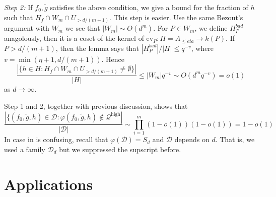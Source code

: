 \documentclass[12pt]{article}
\theoremstyle{plain}
\theoremstyle{definition}
\newcommand{\sD}{\mathcal{D}}
\newcommand{\<}{\langle}
\renewcommand{\>}{\rangle}
\def\wt{\widetilde}
\newcommand{\Qhigh}{\mathcal{Q}^\mathrm{high}}
\newcommand{\ev}{\mathrm{ev}}
\begin{document}
\textit{Step 2:} If $f_0, \wt{g}$ satisfies the above condition, we give a bound for the fraction of $h$ such that $H_f \cap W_m \cap U_{> d/(m+1)}$.  
This step is easier. Use the same Bezout's argument with $W_m$ we see that $|W_m| \sim O(d^m)$. For $P \in W_m$, we define $H_P^{bad}$ anagolously, then it is a coset of the kernel of $\ev_P : H = A_{\le eta} \to k(P)$. If $P > d/(m+1)$, then the lemma says that $|H_P^{bad}|/|H| \le q^{-v}$, where $v = \min (\eta + 1, d/(m+1))$. Hence
$$\frac{|\{h \in H : H_f \cap W_m \cap U_{> d/(m+1)} \neq \emptyset \}|}{|H|} \le |W_m| q^{-v} \sim O(d^m q^{-v}) = o(1)$$ as $d \to \infty$. 

Step 1 and 2, together with previous discussion, shows that 
$$ \frac{|\{(f_0, \wt{g}, h) \in \sD: \varphi(f_0, \wt{g}, h) \not\in \Qhigh|}{|\sD|} \sim \prod_{i=1}^m (1 - o(1))(1 - o(1)) = 1 - o(1) $$
In case in is confusing, recall that $\varphi(\sD) = S_d$ and $\sD$ depends on $d$. That is, we used a family $\sD_d$ but we suppressed the supscript before. 

\section{Applications}
\end{document}
